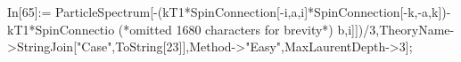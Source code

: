 In[65]:= ParticleSpectrum[-(kT1*SpinConnection[-i,a,i]*SpinConnection[-k,-a,k])-kT1*SpinConnectio (*omitted 1680 characters for brevity*) b,i]])/3,TheoryName->StringJoin["Case",ToString[23]],Method->"Easy",MaxLaurentDepth->3];